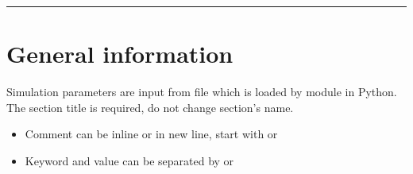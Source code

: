 \documentclass[letterpaper,10pt,english]{sphinxmanual}
\begin{document}
\begin{sphinxVerbatim}[commandchars=\\\{\}]
 
  
  
 
  
 
  
        
  
 
  
            
\end{sphinxVerbatim}


\bigskip\hrule\bigskip



\section{General information}
\label{\detokenize{usage/simulation_control:general-information}}
\sphinxAtStartPar
Simulation parameters are input from  file which is loaded by  module in Python.
The section title \sphinxcode{\sphinxupquote{{[}OPTIONS{]}}} is required, do not change section’s name.
\begin{itemize}
\item {} 
\sphinxAtStartPar
Comment can be inline or in new line, start with \sphinxtitleref{;} or \sphinxtitleref{\#}

\item {} 
\sphinxAtStartPar
Keyword and value can be separated by \sphinxtitleref{=} or \sphinxtitleref{:}

\end{itemize}
\end{document}

